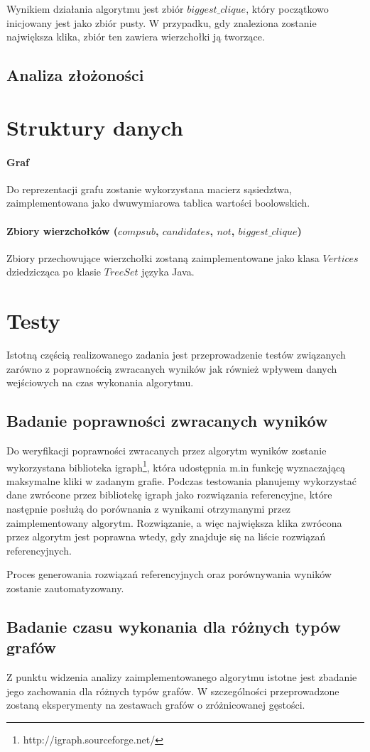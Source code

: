 \documentclass[12pt, a4paper]{article}
\begin{document}
Wynikiem działania algorytmu jest zbiór $biggest\_clique$, który początkowo inicjowany jest jako zbiór pusty. W przypadku, gdy znaleziona zostanie największa klika, zbiór ten zawiera wierzchołki ją tworzące.

\subsection{Analiza złożoności}

\section{Struktury danych}
\paragraph{Graf}
Do reprezentacji grafu zostanie wykorzystana macierz sąsiedztwa, zaimplementowana jako dwuwymiarowa tablica wartości boolowskich.

\paragraph{Zbiory wierzchołków ($compsub$, $candidates$, $not$, $biggest\_clique$)}
Zbiory przechowujące wierzchołki zostaną zaimplementowane jako klasa $Vertices$ dziedzicząca po klasie $TreeSet$ języka Java.

\section{Testy}
Istotną częścią realizowanego zadania jest przeprowadzenie testów związanych zarówno z poprawnością zwracanych wyników jak również wpływem danych wejściowych na czas wykonania algorytmu.

\subsection{Badanie poprawności zwracanych wyników}
Do weryfikacji poprawności zwracanych przez algorytm wyników zostanie wykorzystana biblioteka igraph\footnote{http://igraph.sourceforge.net/}, która udostępnia m.in funkcję wyznaczającą maksymalne kliki w zadanym grafie. Podczas testowania planujemy wykorzystać dane zwrócone przez bibliotekę igraph jako rozwiązania referencyjne, które następnie posłużą do porównania z wynikami otrzymanymi przez zaimplementowany algorytm. Rozwiązanie, a więc największa klika zwrócona przez algorytm jest poprawna wtedy, gdy znajduje się na liście rozwiązań referencyjnych.

Proces generowania rozwiązań referencyjnych oraz porównywania wyników zostanie zautomatyzowany.
\subsection{Badanie czasu wykonania dla różnych typów grafów}
Z punktu widzenia analizy zaimplementowanego algorytmu istotne jest zbadanie jego zachowania dla różnych typów grafów. W szczególności przeprowadzone zostaną eksperymenty na zestawach grafów o zróżnicowanej gęstości.



\end{document}
